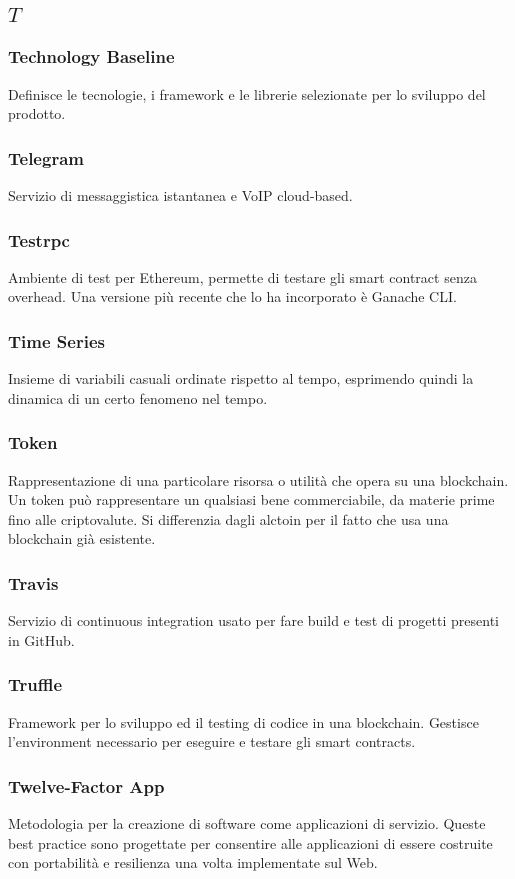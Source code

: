 \subsection*{\quad$T\quad$}
\subsubsection*{Technology Baseline}
Definisce le tecnologie, i framework e le librerie selezionate per lo sviluppo del prodotto.

\subsubsection*{Telegram}
Servizio di messaggistica istantanea  e VoIP cloud-based.

\subsubsection*{Testrpc}
Ambiente di test per Ethereum, permette di testare gli smart contract senza overhead. Una versione più recente che lo ha incorporato è Ganache CLI\glo.

\subsubsection*{Time Series}
Insieme di variabili casuali ordinate rispetto al tempo, esprimendo quindi la dinamica di un certo fenomeno nel tempo.

\subsubsection*{Token}
Rappresentazione di una particolare risorsa o utilità che opera su una blockchain\glo. Un token può rappresentare un qualsiasi bene commerciabile, da materie prime fino alle criptovalute. Si differenzia dagli alctoin per il fatto che usa una blockchain già esistente.

\subsubsection*{Travis}
Servizio di continuous integration usato per fare build e test di progetti presenti in GitHub.

\subsubsection*{Truffle}
Framework per lo sviluppo ed il testing di codice in una blockchain\glo. Gestisce l'environment necessario per eseguire e testare gli smart contracts\glo.

\subsubsection*{Twelve-Factor App}
Metodologia per la creazione di software come applicazioni di servizio. Queste best practice sono progettate per consentire alle applicazioni di essere costruite con portabilità e resilienza una volta implementate sul Web.

